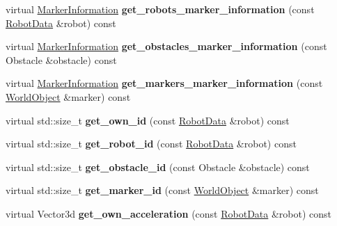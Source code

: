 \begin{CompactItemize}
\item 
\hypertarget{class_view_38653a1c879f5e6c7c87eff649099a35}{
virtual \hyperlink{class_marker_information}{MarkerInformation} \textbf{get\_\-robots\_\-marker\_\-information} (const \hyperlink{class_robot_data}{RobotData} \&robot) const }
\label{class_view_38653a1c879f5e6c7c87eff649099a35}

\item 
\hypertarget{class_view_fd1b25e5b644b750a7e6b023425115a0}{
virtual \hyperlink{class_marker_information}{MarkerInformation} \textbf{get\_\-obstacles\_\-marker\_\-information} (const Obstacle \&obstacle) const }
\label{class_view_fd1b25e5b644b750a7e6b023425115a0}

\item 
\hypertarget{class_view_86cf2c9c7015f91ee3a065bc2ae65336}{
virtual \hyperlink{class_marker_information}{MarkerInformation} \textbf{get\_\-markers\_\-marker\_\-information} (const \hyperlink{class_world_object}{WorldObject} \&marker) const }
\label{class_view_86cf2c9c7015f91ee3a065bc2ae65336}

\item 
\hypertarget{class_view_b13cfba86985a55f05594e6cb7aa4350}{
virtual std::size\_\-t \textbf{get\_\-own\_\-id} (const \hyperlink{class_robot_data}{RobotData} \&robot) const }
\label{class_view_b13cfba86985a55f05594e6cb7aa4350}

\item 
\hypertarget{class_view_8df1d4d98fa5cb5e02cf7a75d9f92291}{
virtual std::size\_\-t \textbf{get\_\-robot\_\-id} (const \hyperlink{class_robot_data}{RobotData} \&robot) const }
\label{class_view_8df1d4d98fa5cb5e02cf7a75d9f92291}

\item 
\hypertarget{class_view_6b86f8d88388f1da8a03bbf0f158ccbb}{
virtual std::size\_\-t \textbf{get\_\-obstacle\_\-id} (const Obstacle \&obstacle) const }
\label{class_view_6b86f8d88388f1da8a03bbf0f158ccbb}

\item 
\hypertarget{class_view_1ac0779af646011347e44b7e6604d149}{
virtual std::size\_\-t \textbf{get\_\-marker\_\-id} (const \hyperlink{class_world_object}{WorldObject} \&marker) const }
\label{class_view_1ac0779af646011347e44b7e6604d149}

\item 
\hypertarget{class_view_cf225b01ce54de48c6b6617ed14b843a}{
virtual Vector3d \textbf{get\_\-own\_\-acceleration} (const \hyperlink{class_robot_data}{RobotData} \&robot) const }
\label{class_view_cf225b01ce54de48c6b6617ed14b843a}


\end{CompactItemize}
